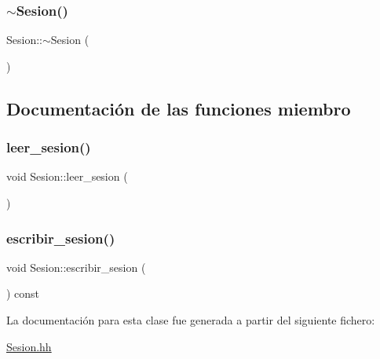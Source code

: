 \mbox{\label{class_sesion_acc4bd3e753a45d6b7a01aa27fb8f171f}} 
\subsubsection{\texorpdfstring{$\sim$\+Sesion()}{~Sesion()}}
{\footnotesize\ttfamily Sesion\+::$\sim$\+Sesion (\begin{DoxyParamCaption}{ }\end{DoxyParamCaption})}



\subsection{Documentación de las funciones miembro}
\mbox{\label{class_sesion_a970d42fc3310a465b78b5a1549c30ec1}} 
\subsubsection{\texorpdfstring{leer\+\_\+sesion()}{leer\_sesion()}}
{\footnotesize\ttfamily void Sesion\+::leer\+\_\+sesion (\begin{DoxyParamCaption}{ }\end{DoxyParamCaption})}

\mbox{\label{class_sesion_a0472395ecd329355cccd46b3d3e8a8a0}} 
\subsubsection{\texorpdfstring{escribir\+\_\+sesion()}{escribir\_sesion()}}
{\footnotesize\ttfamily void Sesion\+::escribir\+\_\+sesion (\begin{DoxyParamCaption}{ }\end{DoxyParamCaption}) const}



La documentación para esta clase fue generada a partir del siguiente fichero\+:\begin{DoxyCompactItemize}
\item 
\mbox{\hyperlink{_sesion_8hh}{Sesion.\+hh}}\end{DoxyCompactItemize}
